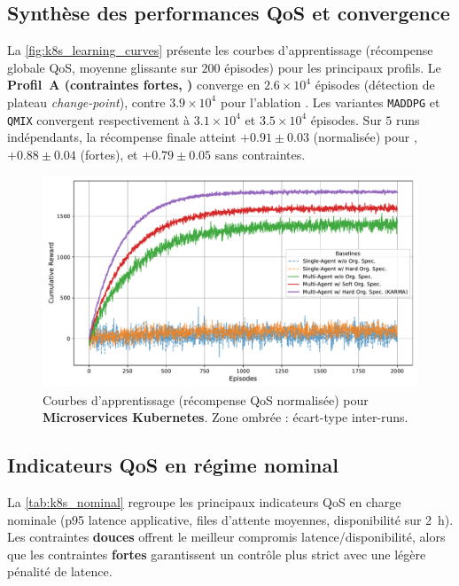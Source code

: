 \subsection*{Synthèse des performances QoS et convergence}

La \autoref{fig:k8s_learning_curves} présente les courbes d’apprentissage (récompense globale QoS, moyenne glissante sur $200$ épisodes) pour les principaux profils.
Le \textbf{Profil~A (contraintes fortes, )} converge en $2.6\times 10^4$ épisodes (détection de plateau \emph{change-point}), contre $3.9\times 10^4$ pour l’ablation \texttt{}.
Les variantes \texttt{MADDPG} et \texttt{QMIX} convergent respectivement à $3.1\times 10^4$ et $3.5\times 10^4$ épisodes.
Sur $5$ runs indépendants, la récompense finale atteint $+0.91 \pm 0.03$ (normalisée) pour , $+0.88 \pm 0.04$ (fortes), et $+0.79 \pm 0.05$ sans contraintes.

\begin{figure}[h!]
    \centering
    \includegraphics[width=0.75\linewidth]{figures/results_k8s_learning.pdf}
    \caption[Courbes d’apprentissage (récompense QoS normalisée) pour \textbf{Microservices Kubernetes}]{Courbes d’apprentissage (récompense QoS normalisée) pour \textbf{Microservices Kubernetes}. Zone ombrée : écart-type inter-runs.}
    \label{fig:k8s_learning_curves}
\end{figure}

\subsection*{Indicateurs QoS en régime nominal}

La \autoref{tab:k8s_nominal} regroupe les principaux indicateurs QoS en charge nominale (p95 latence applicative, files d’attente moyennes, disponibilité sur 2~h).
Les contraintes \textbf{douces} offrent le meilleur compromis latence/disponibilité, alors que les contraintes \textbf{fortes} garantissent un contrôle plus strict avec une légère pénalité de latence.

